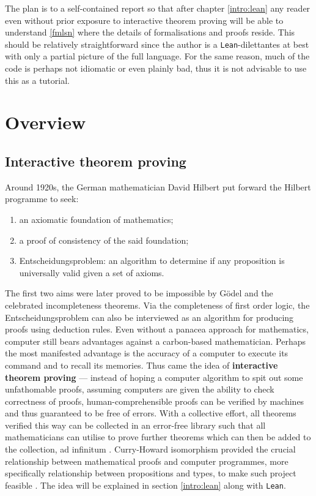 \documentclass{report}
\begin{document}
The plan is to a self-contained report so that after chapter \ref{intro:lean} any reader even without prior exposure to interactive theorem proving will be able to understand \ref{fmlsn} where the details of formalisations and proofs reside. This should be relatively straightforward since the author is a {\tt Lean}-dilettantes at best with only a partial picture of the full language. For the same reason, much of the code is perhaps not idiomatic or even plainly bad, thus it is not advisable to use this as a tutorial.

\tableofcontents

\chapter{Overview}
\section{Interactive theorem proving}
Around 1920s, the German mathematician David Hilbert put forward the Hilbert programme to seek:
\begin{enumerate}
  \item an axiomatic foundation of mathematics;
  \item a proof of consistency of the said foundation;
  \item Entscheidungsproblem: an algorithm to determine if any proposition is universally valid given a set of axioms.
\end{enumerate}
The first two aims were later proved to be impossible by G\"odel and the celebrated incompleteness theorems. Via the completeness of first order logic, the Entscheidungsproblem can also be interviewed as an algorithm for producing proofs using deduction rules. Even without a panacea approach for mathematics, computer still bears advantages against a carbon-based mathematician. Perhaps the most manifested advantage is the accuracy of a computer to execute its command and to recall its memories. Thus came the idea of {\bf interactive theorem proving} --- instead of hoping a computer algorithm to spit out some unfathomable proofs, assuming computers are given the ability to check correctness of proofs, human-comprehensible proofs can be verified by machines and thus guaranteed to be free of errors. With a collective effort, all theorems verified this way can be collected in an error-free library such that all mathematicians can utilise to prove further theorems which can then be added to the collection, ad infinitum \cite{boyer1994qed}. Curry-Howard isomorphism provided the crucial relationship between mathematical proofs and computer programmes, more specifically relationship between propositions and types, to make such project feasible \cite{kennedy2011set}. The idea will be explained in section \ref{intro:lean} along with {\tt Lean}. 
\end{document}
